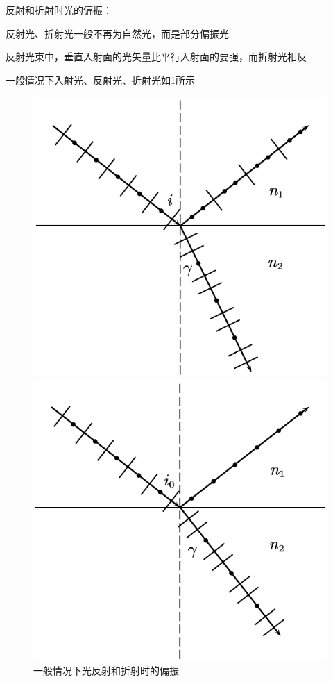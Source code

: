 \documentclass[12pt, a4paper, twoside]{ctexbook}
\begin{document}
{\sonti 反射和折射时光的偏振}：

反射光、折射光一般不再为自然光，而是部分偏振光

反射光束中，垂直入射面的光矢量比平行入射面的要强，而折射光相反

一般情况下入射光、反射光、折射光如\textcolor{blue}{\cref{fig:一般反射折射}}所示
\begin{figure}[H]
    \centering
    \begin{minipage}{0.48\linewidth}
        \centering
        \includegraphics[scale=0.66]{一般反射折射.pdf}
        \caption{一般情况下光反射和折射时的偏振}
        \label{fig:一般反射折射}
    \end{minipage}
    \begin{minipage}{0.48\linewidth}
        \centering
        \includegraphics[scale=0.66]{布儒斯特角入射情况反射折射.pdf}

\end{minipage}
\end{figure}
\end{document}
